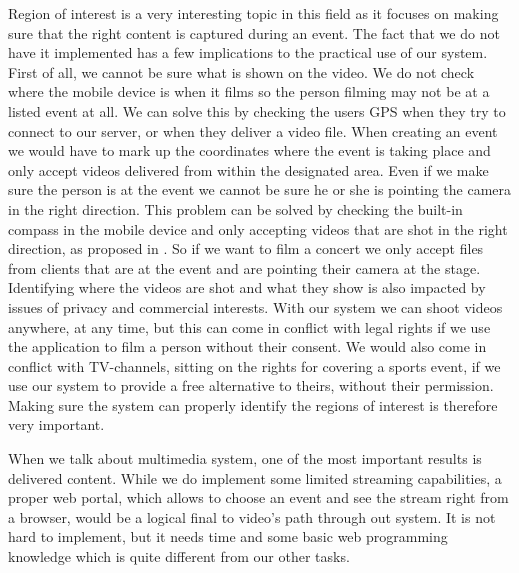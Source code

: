 \documentclass[conference]{IEEEtran}
\begin{document}
Region of interest is a very interesting topic in this field as it focuses on making sure 
that the right content is captured during an event.
The fact that we do not have it implemented has a few implications to the practical use of our system.
First of all, we cannot be sure what is shown on the video. 
We do not check where the mobile device is when it films so the person filming may not be at a listed event at all.
We can solve this by checking the users GPS when they try to connect to our server, or when they deliver a video file.
When creating an event we would have to mark up the coordinates where the event is taking place 
and only accept videos delivered from within the designated area.
Even if we make sure the person is at the event we cannot be sure he or she is pointing the camera in the right direction.
This problem can be solved by checking the built-in compass in the mobile device 
and only accepting videos that are shot in the right direction, as proposed in \cite{cricri_sensor-based_2012}.
So if we want to film a concert we only accept files from clients that are at the event and are pointing their camera at the stage. 
Identifying where the videos are shot and what they show is also impacted by issues of privacy and commercial interests. 
With our system we can shoot videos anywhere, at any time, but this can come in conflict with legal rights 
if we use the application to film a person without their consent.
We would also come in conflict with TV-channels, sitting on the rights for covering a sports event, 
if we use our system to provide a free alternative to theirs, without their permission. 
Making sure the system can properly identify the regions of interest is therefore very important.

When we talk about multimedia system, one of the most important results is delivered content. 
While we do implement some limited streaming capabilities, a proper web portal, which allows to choose an event 
and see the stream right from a browser, would be a logical final to video's path through out system.
It is not hard to implement, but it needs time and some basic web programming knowledge which is quite different from our other tasks.
\end{document}
